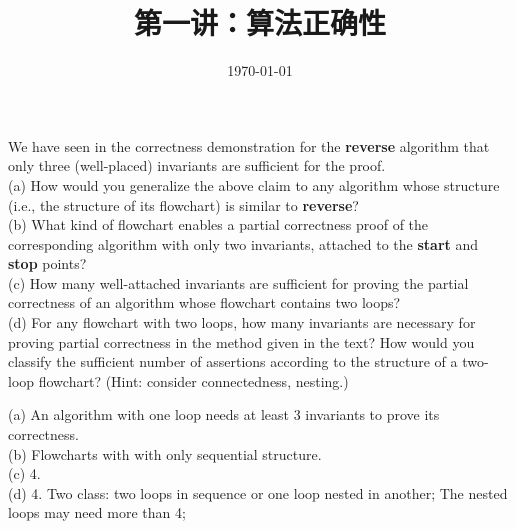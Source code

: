 \documentclass[11pt, a4paper, UTF8]{ctexart}
\title{第一讲：算法正确性}
\date{\today}     %
\begin{document}
\maketitle
\noplagiarism	%
\beginthishw	%

\begin{problem}[DH: 5.6]	%
  We have seen in the correctness demonstration for the \textbf{reverse} 
  algorithm that only three (well-placed) invariants are sufficient for 
  the proof.\\
  (a) How would you generalize the above claim to any algorithm whose structure
  (i.e., the structure of its flowchart) is similar to \textbf{reverse}?\\
  (b) What kind of flowchart enables a partial correctness proof of the 
  corresponding algorithm with only two invariants, attached to the \textbf{start} 
  and \textbf{stop} points?\\
  (c) How many well-attached invariants are sufficient for proving the partial 
  correctness of an algorithm whose flowchart contains two loops?\\
  (d) For any flowchart with two loops, how many invariants are necessary for 
  proving partial correctness in the method given in the text? How would you 
  classify the sufficient number of assertions according to the structure of 
  a two-loop flowchart? (Hint: consider connectedness, nesting.)
\end{problem}



\begin{solution}
  (a) An algorithm with one loop needs at least 3 invariants to prove its 
  correctness.\\
  (b) Flowcharts with with only sequential structure.\\
  (c) 4.\\
  (d) 4. Two class: two loops in sequence or one loop nested in another; 
  The nested loops may need more than 4;
\end{solution}
\end{document}
